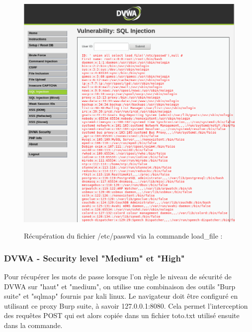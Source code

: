 \begin{figure}[!h]
	\begin{center}
		\label{}
		\includegraphics[scale=\scaledvwa]{images/sql/sqli_low2.png}
		\caption{Récupération du fichier /etc/passwd via la commande load\_file : }
	\end{center}
\end{figure}










\subsubsection{DVWA - Security level "Medium" et "High"}

Pour récupérer les mots de passe lorsque l'on règle le niveau de sécurité de DVWA sur "haut" et "medium", on utilise une combinaison des outils "Burp suite" et "sqlmap" fournis par kali linux. Le navigateur doit être configuré en utilisant ce proxy Burp suite, à savoir 127.0.0.1:8080. Cela permet l'interception des requêtes POST qui est alors copiée dans un fichier toto.txt utilisé ensuite dans la commande.

